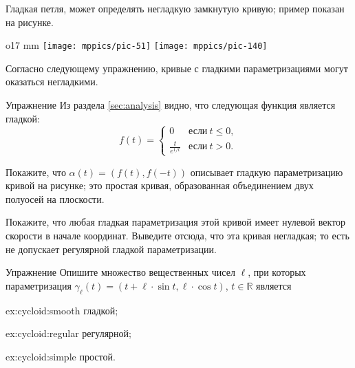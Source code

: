Гладкая петля, может определять негладкую замкнутую кривую;
пример показан на рисунке.

\begin{wrapfigure}{o}{17 mm}
\vskip-4mm
\centering
\texttt{[image: mppics/pic-51]}
\bigskip
\texttt{[image: mppics/pic-140]}
\vskip-8mm
\end{wrapfigure}

Согласно следующему упражнению, кривые с гладкими параметризациями могут оказаться негладкими.

\begin{thm}{Упражнение}\label{ex:L-shape}
Из раздела \ref{sec:analysis} видно, что следующая функция является гладкой:
\[f(t)=
\begin{cases}
0&\text{если}\ t\le 0,
\\
\frac{t}{e^{1\!/\!t}}&\text{если}\ t> 0.
\end{cases}
\]

Покажите, что $\alpha(t)=(f(t),f(-t))$ описывает гладкую параметризацию кривой на рисунке;
это простая кривая, образованная объединением двух полуосей на плоскости.

{\sloppy

Покажите, что любая гладкая параметризация этой кривой имеет нулевой вектор скорости в начале координат.
Выведите отсюда, что эта кривая негладкая;
то есть не допускает регулярной гладкой параметризации.

}

\end{thm}

\begin{thm}{Упражнение}\label{ex:cycloid}
Опишите множество вещественных чисел $\ell$, 
при которых параметризация $\gamma_\ell (t)= (t+\ell \cdot \sin t,\ell \cdot \cos t)$, $t\in\mathbb{R}$ является

\begin{minipage}{.30\textwidth}
\begin{subthm}{ex:cycloid:smooth}
гладкой; 
\end{subthm}
\end{minipage}
\hfill
\begin{minipage}{.30\textwidth}
\begin{subthm}{ex:cycloid:regular}
регулярной;
\end{subthm}
\end{minipage}
\hfill
\begin{minipage}{.30\textwidth}
\begin{subthm}{ex:cycloid:simple}
простой.
\end{subthm}
\end{minipage}

\end{thm}

